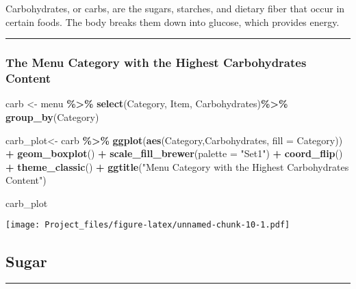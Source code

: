 \documentclass[
]{article}
\newenvironment{Shaded}{\begin{snugshade}}{\end{snugshade}}
\newcommand{\AttributeTok}[1]{\textcolor[rgb]{0.13,0.29,0.53}{#1}}
\newcommand{\FunctionTok}[1]{\textcolor[rgb]{0.13,0.29,0.53}{\textbf{#1}}}
\newcommand{\NormalTok}[1]{#1}
\newcommand{\OtherTok}[1]{\textcolor[rgb]{0.56,0.35,0.01}{#1}}
\newcommand{\SpecialCharTok}[1]{\textcolor[rgb]{0.81,0.36,0.00}{\textbf{#1}}}
\newcommand{\StringTok}[1]{\textcolor[rgb]{0.31,0.60,0.02}{#1}}
\begin{document}
Carbohydrates, or carbs, are the sugars, starches, and dietary fiber
that occur in certain foods. The body breaks them down into glucose,
which provides energy.

\begin{center}\rule{0.5\linewidth}{0.5pt}\end{center}

\hypertarget{the-menu-category-with-the-highest-carbohydrates-content}{%
\subsubsection{The Menu Category with the Highest Carbohydrates
Content}\label{the-menu-category-with-the-highest-carbohydrates-content}}

\begin{Shaded}
\begin{Highlighting}[]
\NormalTok{carb }\OtherTok{\textless{}{-}}\NormalTok{ menu }\SpecialCharTok{\%\textgreater{}\%} 
  \FunctionTok{select}\NormalTok{(Category,}
\NormalTok{         Item,}
\NormalTok{         Carbohydrates)}\SpecialCharTok{\%\textgreater{}\%} 
  \FunctionTok{group\_by}\NormalTok{(Category) }

\NormalTok{carb\_plot}\OtherTok{\textless{}{-}}\NormalTok{ carb }\SpecialCharTok{\%\textgreater{}\%}
  \FunctionTok{ggplot}\NormalTok{(}\FunctionTok{aes}\NormalTok{(Category,Carbohydrates, }
             \AttributeTok{fill =}\NormalTok{ Category)) }\SpecialCharTok{+} 
  \FunctionTok{geom\_boxplot}\NormalTok{() }\SpecialCharTok{+}
  \FunctionTok{scale\_fill\_brewer}\NormalTok{(}\AttributeTok{palette =} \StringTok{"Set1"}\NormalTok{) }\SpecialCharTok{+} \FunctionTok{coord\_flip}\NormalTok{() }\SpecialCharTok{+} \FunctionTok{theme\_classic}\NormalTok{() }\SpecialCharTok{+} \FunctionTok{ggtitle}\NormalTok{(}\StringTok{"Menu Category with the Highest Carbohydrates Content"}\NormalTok{)}

\NormalTok{carb\_plot}
\end{Highlighting}
\end{Shaded}

\texttt{[image: Project\_files/figure-latex/unnamed-chunk-10-1.pdf]}

\hypertarget{sugar}{%
\subsection{Sugar}\label{sugar}}

\begin{center}\rule{0.5\linewidth}{0.5pt}\end{center}
\end{document}
